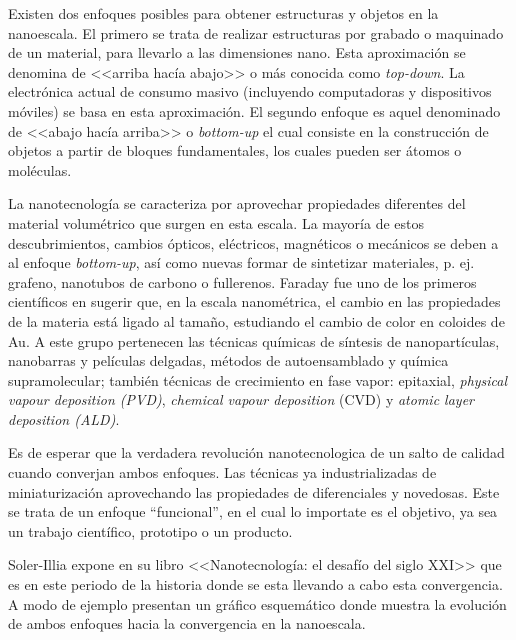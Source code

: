 		Existen dos enfoques posibles para obtener estructuras y objetos en la nanoescala. El primero se trata de realizar estructuras por grabado o maquinado de un material, para llevarlo a las dimensiones nano. Esta aproximación se denomina de <<arriba hacía abajo>> o más conocida como \textit{top-down}. La electrónica actual de consumo masivo (incluyendo computadoras y dispositivos móviles) se basa en esta aproximación. El segundo enfoque es aquel denominado de <<abajo hacía arriba>> o \textit{bottom-up} el cual consiste en la construcción de objetos a partir de bloques fundamentales, los cuales pueden ser átomos o moléculas. 

		La nanotecnología se caracteriza por aprovechar propiedades diferentes del material volumétrico que surgen en esta escala. La mayoría de estos descubrimientos, cambios ópticos, eléctricos, magnéticos o mecánicos se deben a al enfoque \textit{bottom-up}, así como nuevas formar de sintetizar materiales, p. ej. grafeno, nanotubos de carbono o fullerenos. Faraday fue uno de los primeros científicos en sugerir que, en la escala nanométrica, el cambio en las propiedades de la materia está ligado al tamaño, estudiando el cambio de color en coloides de Au\cite{faraday1857}. A este grupo pertenecen las técnicas químicas de síntesis de nanopartículas, nanobarras y películas delgadas, métodos de autoensamblado y química supramolecular; también técnicas de crecimiento en fase vapor: epitaxial, \textit{physical vapour deposition (PVD)}, \textit{chemical vapour deposition} (CVD) y \textit{atomic layer deposition (ALD)}.
			
		Es de esperar que la verdadera revolución nanotecnologica de un salto de calidad cuando converjan ambos enfoques. Las técnicas ya industrializadas de miniaturización aprovechando las propiedades de diferenciales y novedosas. Este se trata de un enfoque ``funcional'', en el cual lo importate es el objetivo, ya sea un trabajo científico, prototipo o un producto.

		Soler-Illia expone en su libro <<Nanotecnología: el desafío del siglo XXI>>\cite{nanotecnologia-galo} que es en este periodo de la historia donde se esta llevando a cabo esta convergencia. A modo de ejemplo presentan un gráfico esquemático donde muestra la evolución de ambos enfoques hacia la convergencia en la nanoescala.

